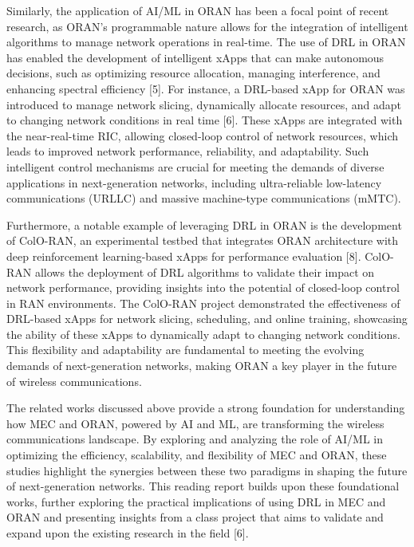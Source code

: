 Similarly, the application of AI/ML in ORAN has been a focal point of recent research, as ORAN's programmable nature allows for the integration of intelligent algorithms to manage network operations in real-time. The use of DRL in ORAN has enabled the development of intelligent xApps that can make autonomous decisions, such as optimizing resource allocation, managing interference, and enhancing spectral efficiency [5]. For instance, a DRL-based xApp for ORAN was introduced to manage network slicing, dynamically allocate resources, and adapt to changing network conditions in real time [6]. These xApps are integrated with the near-real-time RIC, allowing closed-loop control of network resources, which leads to improved network performance, reliability, and adaptability. Such intelligent control mechanisms are crucial for meeting the demands of diverse applications in next-generation networks, including ultra-reliable low-latency communications (URLLC) and massive machine-type communications (mMTC).

Furthermore, a notable example of leveraging DRL in ORAN is the development of ColO-RAN, an experimental testbed that integrates ORAN architecture with deep reinforcement learning-based xApps for performance evaluation [8]. ColO-RAN allows the deployment of DRL algorithms to validate their impact on network performance, providing insights into the potential of closed-loop control in RAN environments. The ColO-RAN project demonstrated the effectiveness of DRL-based xApps for network slicing, scheduling, and online training, showcasing the ability of these xApps to dynamically adapt to changing network conditions. This flexibility and adaptability are fundamental to meeting the evolving demands of next-generation networks, making ORAN a key player in the future of wireless communications.

The related works discussed above provide a strong foundation for understanding how MEC and ORAN, powered by AI and ML, are transforming the wireless communications landscape. By exploring and analyzing the role of AI/ML in optimizing the efficiency, scalability, and flexibility of MEC and ORAN, these studies highlight the synergies between these two paradigms in shaping the future of next-generation networks. This reading report builds upon these foundational works, further exploring the practical implications of using DRL in MEC and ORAN and presenting insights from a class project that aims to validate and expand upon the existing research in the field [6].